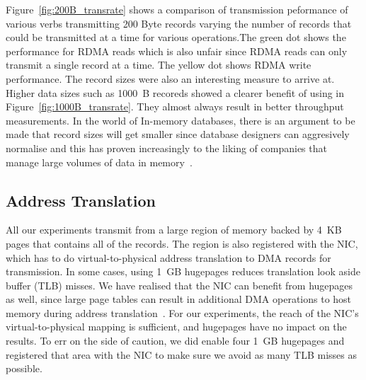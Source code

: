 
Figure~\ref{fig:200B_transrate} shows a comparison of transmission
peformance of various verbs transmitting 200 Byte records varying the number of records
that could be transmitted at a time for various operations.The green dot shows
the performance for RDMA reads which is also unfair
since RDMA reads can only transmit a single record at a time. The yellow dot
shows RDMA write performance. The record sizes were 
also an interesting measure to arrive at. Higher data sizes such as 1000~B recoreds showed a clearer benefit of using  in Figure~\ref{fig:1000B_transrate}.
They almost always result in better throughput measurements. In the world of In-memory databases,
there is an argument to be made that record sizes will get smaller since 
database designers can aggresively normalise and this has proven increasingly to
the liking of companies that manage large volumes of data in memory~\cite{fb-memcache,fb-workload}.



\subsection{Address Translation}
All our experiments transmit from a large region of memory backed by 4~KB pages
that contains all of the records. The region is also
registered with the NIC, which has to do virtual-to-physical address
translation to DMA records for transmission.
In some cases, using 1~GB hugepages reduces translation look aside buffer
(TLB) misses. We have realised that the NIC can benefit from
hugepages as well, since large page tables can result in additional
DMA operations to host memory during address translation~\cite{farm,rdma}. For
our experiments, the reach of the NIC's virtual-to-physical mapping is
sufficient, and hugepages have no impact on the results. To err on the side of caution, 
we did enable four 1~GB hugepages and registered that area with the NIC to make sure we 
avoid as many TLB misses as possible.



